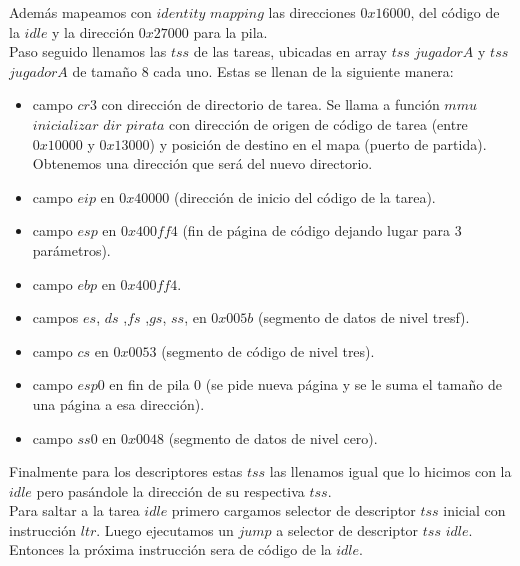 Además mapeamos con $identity$ $mapping$ las direcciones $0x16000$, del código de la $idle$ y la dirección 
$0x27000$ para la pila.\\
Paso seguido llenamos las $tss$ de las tareas, ubicadas en array $tss$ $jugadorA$ y $tss$ $jugadorA$ de tamaño 8
cada uno. Estas se llenan de la siguiente manera:

\begin{itemize}
\item campo $cr3$ con dirección de directorio de tarea. Se llama a función $mmu$ $inicializar$ $dir$ $pirata$ 
con dirección de origen de código de tarea (entre $0x10000$ y $0x13000$) y posición de destino en el mapa 
(puerto de partida). Obtenemos una dirección que será del nuevo directorio.
\item campo $eip$ en $0x40000$ (dirección de inicio del código de la tarea).
\item campo $esp$ en $0x400ff4$ (fin de página de código dejando lugar para 3 parámetros).  
\item campo $ebp$ en $0x400ff4$.  
\item campos $es$, $ds$ ,$fs$ ,$gs$, $ss$, en $0x005b$ (segmento de datos de nivel tresf).
\item campo $cs$ en $0x0053$ (segmento de código de nivel tres).
\item campo $esp0$ en fin de pila 0 (se pide nueva página y se le suma el tamaño de una página a esa
dirección).
\item campo $ss0$ en $0x0048$ (segmento de datos de nivel cero).
\end{itemize}

Finalmente para los descriptores estas $tss$ las llenamos igual que lo hicimos con 
la $idle$ pero pasándole la dirección de su respectiva $tss$.\\

Para saltar a la tarea $idle$ primero cargamos selector de descriptor $tss$ inicial con instrucción $ltr$.
Luego ejecutamos un $jump$ a selector de descriptor $tss$ $idle$. Entonces la próxima instrucción sera
de código de la $idle$. 



